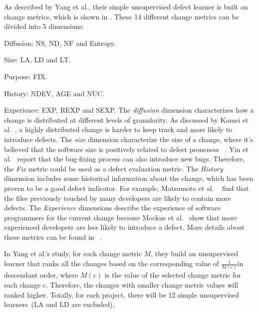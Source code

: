 As described by Yang et al.\cite{yang2016effort},  their simple unsupervised
 defect learner is built on change metrics, which is shown in . These
 14 different change metrics can be divided into 5 dimensions\cite{kamei2013large}:
 \bi
 \item Diffusion: NS, ND, NF and Entropy.
 \item Size: LA, LD and LT.
 \item Purpose: FIX.
 \item History: NDEV, AGE and NUC.
 \item Experience: EXP, REXP and SEXP.
 \ei 
The {\it diffusion} dimension characterizes how a change is 
distributed at different levels of granularity.
As discussed by Kamei et al.~\cite{kamei2013large},
a highly distributed change is harder to keep track
and more likely to introduce defects. The {\it size} dimension
characterize the size of a change, where it's believed that
the software size is positively related to defect proneness
~\cite{nagappan2005use,koru2009investigation}. Yin et al.~\cite{yin2011fixes}
report that the bug-fixing process can also introduce new bugs. 
Therefore, the {\it Fix} metric could be used as a defect evaluation metric.
The {\it History} dimension includes some historical information
about the change, which has been proven to be a good defect indicator.
For example, Matsumoto et al. ~\cite{matsumoto2010analysis} find that the files
previously touched by many developers are likely to contain more defects.
The {\it Experience} dimensions describe the experience of software programmers
for the current change because Mockus et al.~\cite{mockus2000predicting} show that
more experienced developers are less likely to introduce a defect. More details
about these metrics can be found in ~\cite{kamei2013large}.

In Yang et al.'s study, for each change metric $M$, 
they build an unsupervised learner that ranks all the changes
based on the corresponding value of $\frac{1}{M(c)}$in descendant order, 
where $M(c)$ is the value of the selected change metric for each change $c$.
Therefore, the changes with smaller change metric values will ranked higher.
Totally, for each project, there will be 12 simple
unsupervised learners~(LA and LD are excluded), 
 
 

